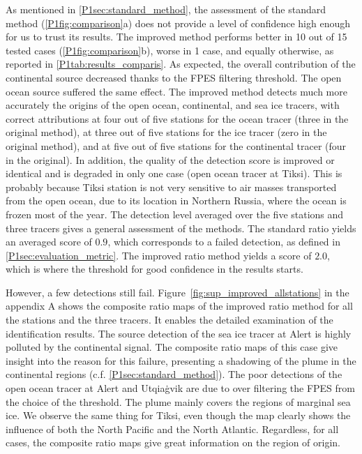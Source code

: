        As mentioned in \cref{P1sec:standard_method}, the assessment of the standard method (\cref{P1fig:comparison}a) does not provide a level of confidence high enough for us to trust its results.
        The improved method performs better in 10 out of 15 tested cases (\cref{P1fig:comparison}b), worse in 1 case, and equally otherwise, as reported in \cref{P1tab:results_comparis}.
        As expected, the overall contribution of the continental source decreased thanks to the FPES filtering threshold.
        The open ocean source suffered the same effect.
        The improved method detects much more accurately the origins of the open ocean, continental, and sea ice tracers, with correct attributions at four out of five stations for the ocean tracer (three in the original method), at three out of five stations for the ice tracer (zero in the original method), and at five out of five stations for the continental tracer (four in the original). In addition, the quality of the detection score is improved or identical and is degraded in only one case (open ocean tracer at Tiksi). This is probably because Tiksi station is not very sensitive to air masses transported from the open ocean, due to its location in Northern Russia, where the ocean is frozen most of the year.
        The detection level averaged over the five stations and three tracers gives a general assessment of the methods. The standard ratio yields an averaged score of $0.9$, which corresponds to a failed detection, as defined in \cref{P1sec:evaluation_metric}. The improved ratio method yields a score of $2.0$, which is where the threshold for good confidence in the results starts.

        However, a few detections still fail.
        Figure~\ref{fig:sup_improved_allstations} in the appendix A shows the composite ratio maps of the improved ratio method for all the stations and the three tracers. It enables the detailed examination of the identification results.
        The source detection of the sea ice tracer at Alert is highly polluted by the continental signal.
        The composite ratio maps of this case give insight into the reason for this failure, presenting a shadowing of the plume in the continental regions (c.f. \cref{P1sec:standard_method}).
        The poor detections of the open ocean tracer at Alert and Utqiaġvik are due to over filtering the FPES from the choice of the  threshold.
        The plume mainly covers the regions of marginal sea ice.
        We observe the same thing for Tiksi, even though the map clearly shows the influence of both the North Pacific and the North Atlantic.
        Regardless, for all cases, the composite ratio maps give great information on the region of origin.

